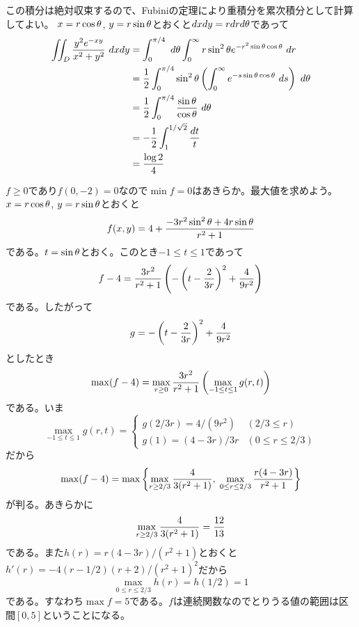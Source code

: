 
\begin{sol}
  この積分は絶対収束するので、Fubiniの定理により重積分を累次積分として計算してよい。
  $x=r \cos {\theta}$, $y = r\sin {\theta}$とおくと$dx dy = r dr d{\theta}$であって
  \begin{align*}
    \iint_D \frac{y^2 e^{-xy} }{ x^2 + y^2 } \ dx dy &= \int_0^{\pi/4} \ d{\theta} \int_0^{\infty} r \sin^2 {\theta} e^{- r^2 \sin {\theta} \cos {\theta}} \ dr \\
    &= \frac{1}{2} \int_0^{\pi/4} \sin^2 {\theta} \left( \int_0^{\infty}   e^{- s \sin {\theta} \cos {\theta}} \ ds \right) \ d{\theta} \\
    &= \frac{1}{2} \int_0^{\pi/4} \frac{ \sin {\theta} }{\cos {\theta} } \ d{\theta} \\
    &= - \frac{1}{2} \int_1^{1/ \sqrt{2} } \frac{dt}{t} \\
    &= \frac{\log 2}{4}
  \end{align*}
\end{sol}

\newpage

\begin{sol}
  $f \geq 0$であり$f(0,-2) = 0$なので$\min f = 0$はあきらか。最大値を求めよう。$x = r \cos {\theta}$, $y = r \sin {\theta}$とおくと
  \[
  f(x,y) = 4 + \frac{ - 3 r^2 \sin^2 {\theta} + 4r \sin {\theta} }{ r^2 + 1 }
  \]
  である。$t = \sin {\theta}$とおく。このとき$-1 \leq t \leq 1$であって
  \[
  f-4 = \frac{ 3r^2}{r^2 +1} \left( -\left( t - \frac{2}{3r} \right)^2+ \frac{4}{9r^2} \right)
  \]
  である。したがって
  \[
  g = -\left( t - \frac{2}{3r} \right)^2+ \frac{4}{9r^2}
  \]
  としたとき
  \[
  \max (f -4) = \max_{r \geq 0} \frac{ 3r^2}{r^2 +1} \left( \max_{-1 \leq t \leq 1} g(r,t) \right)
  \]
  である。いま
  \[
  \max_{-1 \leq t \leq 1} g(r,t) = \begin{cases}
  g(2/3r) = 4/(9r^2) &(2/3 \leq r) \\
  g(1) = (4-3r)/3r &(0 \leq r \leq 2/3)
\end{cases}
  \]
  だから
  \[
  \max (f-4) = \max \left\{  \max_{r \geq 2/3} \frac{4}{3(r^2 + 1)} , \; \max_{0 \leq r \leq 2/3} \frac{r(4-3r)}{r^2+1} \right\}
  \]
  が判る。あきらかに
  \[
  \max_{r \geq 2/3} \frac{4}{3(r^2 + 1)} = \frac{12}{13}
  \]
である。また$h(r) = r(4-3r)/ (r^2+1)$とおくと$h'(r) = -4(r - 1/2)(r+2)/ (r^2 + 1)^2 $だから
\[
\max_{0 \leq r \leq 2/3} h(r) = h(1/2) =1
\]
である。すなわち$\max f = 5$である。$f$は連続関数なのでとりうる値の範囲は区間$[0, 5]$ということになる。
\end{sol}


